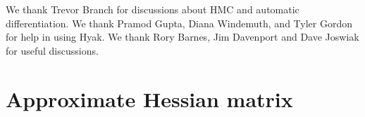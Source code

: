 \documentclass[twocolumn]{aastex63}
\begin{document}
We thank Trevor Branch for discussions about HMC and automatic differentiation.
We thank Pramod Gupta, Diana Windemuth, and Tyler Gordon for help in
using Hyak.  We thank Rory Barnes, Jim Davenport and Dave Joswiak for useful discussions.











\appendix

\section{Approximate Hessian matrix} \label{sec:hessian}
\end{document}
